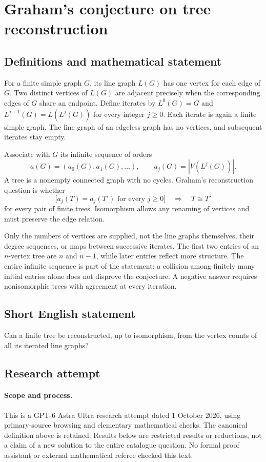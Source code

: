 \documentclass[11pt,a4paper]{article}
\begin{document}
\section*{Graham's conjecture on tree reconstruction}\label{statement}

\subsection{Definitions and mathematical statement}
For a finite simple graph $G$, its line graph $L(G)$ has one vertex
for each edge of $G$. Two distinct vertices of $L(G)$ are adjacent
precisely when the corresponding edges of $G$ share an endpoint.
Define iterates by $L^0(G)=G$ and $L^{j+1}(G)=L(L^j(G))$ for every
integer $j\geq0$. Each iterate is again a finite simple graph.
The line graph of an edgeless graph has no vertices, and subsequent
iterates stay empty.

Associate with $G$ its infinite sequence of orders
\[
 a(G)=(a_0(G),a_1(G),\ldots),\qquad a_j(G)=|V(L^j(G))|.
\]
A tree is a nonempty connected graph with no cycles. Graham's
reconstruction question is whether
\[
 \bigl[a_j(T)=a_j(T')\text{ for every }j\geq0\bigr]
 \quad\Longrightarrow\quad T\cong T'
\]
for every pair of finite trees. Isomorphism allows any renaming
of vertices and must preserve the edge relation.

Only the numbers of vertices are supplied, not the line graphs
themselves, their degree sequences, or maps between successive
iterates. The first two entries of an $n$-vertex tree are $n$ and
$n-1$, while later entries reflect more structure. The entire
infinite sequence is part of the statement: a collision among
finitely many initial entries alone does not disprove the
conjecture. A negative answer requires nonisomorphic trees with
agreement at every iteration.
\subsection{Short English statement}
Can a finite tree be reconstructed, up to isomorphism, from the vertex counts of all its iterated line graphs?
\subsection{Research attempt}
\paragraph{Scope and process.}
This is a GPT-6 Astra Ultra research attempt dated 1 October 2026, using
primary-source browsing and elementary mathematical checks. The canonical
definition above is retained. Results below are restricted results or
reductions, not a claim of a new solution to the entire catalogue question.
No formal proof assistant or external mathematical referee checked this text.
\end{document}
